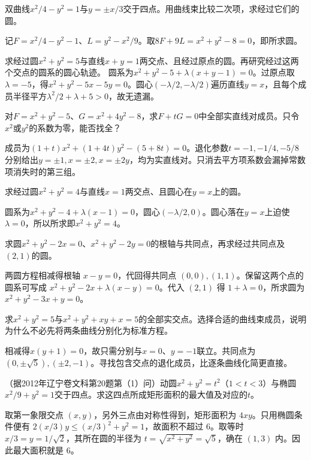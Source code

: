 双曲线\(x^2/4-y^2=1\)与\(y=\pm x/3\)交于四点。用曲线束比较二次项，求经过它们的圆。
\par
\solutionanswer
记\(F=x^2/4-y^2-1\)、\(L=y^2-x^2/9\)。取\(8F+9L=x^2+y^2-8=0\)，即所求圆。


求经过圆\(x^2+y^2=5\)与直线\(x+y=1\)两交点、且经过原点的圆。再研究经过这两个交点的圆系的圆心轨迹。
\solutionanswer
圆系为\(x^2+y^2-5+\lambda(x+y-1)=0\)。过原点取\(\lambda=-5\)，得\(x^2+y^2-5x-5y=0\)。圆心\((-\lambda/2,-\lambda/2)\)遍历直线\(y=x\)，且每个成员半径平方\(\lambda^2/2+\lambda+5>0\)，故无遗漏。


对\(F=x^2+y^2-5\)、\(G=x^2+4y^2-8\)，求\(F+tG=0\)中全部实直线对成员。只令\(x^2\)或\(y^2\)的系数为零，能否找全？
\par
\solutionanswer
成员为\((1+t)x^2+(1+4t)y^2-(5+8t)=0\)。退化参数\(t=-1,-1/4,-5/8\)分别给出\(y=\pm1,x=\pm2,x=\pm2y\)，均为实直线对。只消去平方项系数会漏掉常数项消失时的第三组。


求经过圆\(x^2+y^2=4\)与直线\(x=1\)两交点、且圆心在\(y=x\)上的圆。
\par
\solutionanswer
圆系为\(x^2+y^2-4+\lambda(x-1)=0\)，圆心\((-\lambda/2,0)\)。圆心落在\(y=x\)上迫使\(\lambda=0\)，所以所求即\(x^2+y^2=4\)。


求圆\(x^2+y^2-2x=0\)、\(x^2+y^2-2y=0\)的根轴与共同点，再求经过共同点及\((2,1)\)的圆。
\par
\solutionanswer
两圆方程相减得根轴 \(x-y=0\)，代回得共同点 \((0,0),(1,1)\)。保留这两个点的圆系可写成 \(x^2+y^2-2x+\lambda(x-y)=0\)。代入 \((2,1)\) 得 \(1+\lambda=0\)，所求圆为 \(x^2+y^2-3x+y=0\)。


求\(x^2+y^2=5\)与\(x^2+y^2+xy+x=5\)的全部实交点。选择合适的曲线束成员，说明为什么不必先将两条曲线分别化为标准方程。
\par
\solutionanswer
相减得\(x(y+1)=0\)，故只需分别与\(x=0\)、\(y=-1\)联立。共同点为\((0,\pm\sqrt5),(\pm2,-1)\)。寻找包含交点的退化成员，比逐条曲线化简更直接。


（据2012年辽宁卷文科第20题第（1）问）动圆\(x^2+y^2=t^2\)（\(1<t<3\)）与椭圆\(x^2/9+y^2=1\)交于四点。求这四点所成矩形面积的最大值及对应的\(t\)。
\par
\solutionanswer
取第一象限交点 \((x,y)\)，另外三点由对称性得到，矩形面积为 \(4xy\)。只用椭圆条件便有 \(2(x/3)y\le (x/3)^2+y^2=1\)，故面积不超过 \(6\)。取等时 \(x/3=y=1/\sqrt2\)，其所在圆的半径为 \(t=\sqrt{x^2+y^2}=\sqrt5\)，确在 \((1,3)\) 内。因此最大面积就是 \(6\)。


